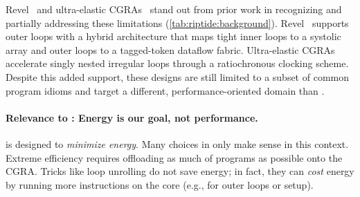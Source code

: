
Revel~\cite{weng2020hybrid} and ultra-elastic CGRAs~\cite{torng2021ultra} stand out from prior work in recognizing and partially addressing these limitations (\autoref{tab:riptide:background}).
% 
Revel~\cite{weng2020hybrid} supports outer loops with a hybrid architecture that maps tight inner loops to a systolic array and outer loops to a tagged-token dataflow fabric.
% 
Ultra-elastic CGRAs~\cite{torng2021ultra} accelerate singly nested irregular loops through a ratiochronous clocking scheme.
% 
Despite this added support, these designs are still limited to a subset of common program idioms and target a different, performance-oriented domain than \riptide.
% 
% 



\paragraph{Relevance to \riptide: Energy is our goal, not performance.}
%
\riptide is designed to \emph{minimize energy}.
%
Many choices in \riptide only make sense in this context.
%
Extreme efficiency requires offloading as much of programs as possible onto the CGRA.
% 
%
Tricks like loop unrolling do not save energy; in fact, they
can \emph{cost} energy by running more instructions on the core
(e.g., for outer loops or setup).
%

